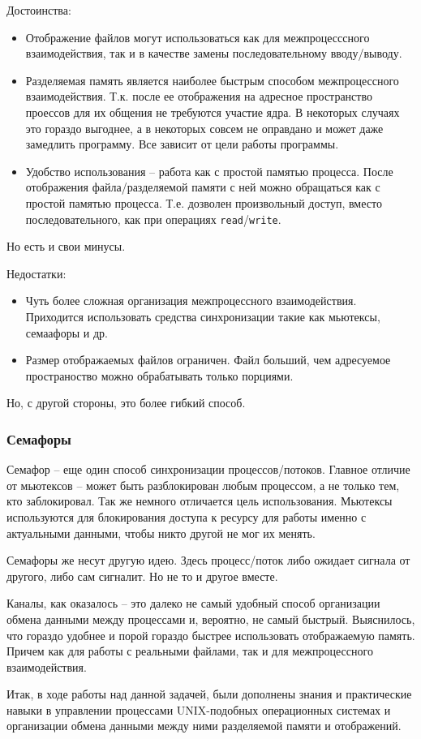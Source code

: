 \documentclass[12pt]{article}
\begin{document}
Достоинства:
\begin{itemize}
    \item   Отображение файлов могут использоваться как для межпроцесссного взаимодействия, так и в качестве замены последовательному вводу/выводу.
    \item   Разделяемая память является наиболее быстрым способом межпроцессного взаимодействия. Т.к. после ее отображения на адресное пространство проессов для их общения не требуются участие ядра.
    В некоторых случаях это гораздо выгоднее, а в некоторых совсем не оправдано и может даже замедлить программу. Все зависит от цели работы программы.
    \item  Удобство использования -- работа как с простой памятью процесса. После отображения файла/разделяемой памяти с ней можно обращаться как с простой памятью процесса. Т.е. дозволен произвольный доступ, вместо последовательного, как при операциях \verb|read|/\verb|write|.
\end{itemize}
        
Но есть и свои минусы.

Недостатки:
\begin{itemize}
         \item Чуть более сложная организация межпроцессного взаимодействия. Приходится использовать средства синхронизации такие как мьютексы, семаафоры и др.
         \item Размер отображаемых файлов ограничен. Файл больший, чем адресуемое пространоство можно обрабатывать только порциями.
\end{itemize}
        Но, с другой стороны, это более гибкий способ.
\subsubsection*{Семафоры}
Семафор -- еще один способ синхронизации процессов/потоков.  
    Главное отличие от мьютексов -- может быть разблокирован любым процессом, а не только тем, кто заблокировал. Так же немного отличается цель использования. Мьютексы используются для блокирования доступа к ресурсу для работы именно с актуальными данными, чтобы никто другой не мог их менять.
    
    Семафоры же несут другую идею. Здесь процесс/поток либо ожидает сигнала от другого, либо сам сигналит. Но не то и другое вместе.
    
Каналы, как оказалось --  это далеко не самый удобный способ организации обмена данными между процессами и, вероятно, не самый быстрый. Выяснилось, что гораздо удобнее и порой гораздо быстрее использовать отображаемую память. Причем как для работы с реальными файлами, так и для межпроцессного взаимодействия.

Итак, в ходе работы над данной задачей, были дополнены знания и практические навыки в управлении процессами UNIX-подобных операционных системах и организации обмена данными между ними разделяемой памяти и отображений.
\end{document}
